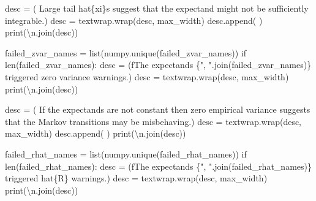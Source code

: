 \documentclass[
  letterpaper,
  DIV=11,
  numbers=noendperiod]{scrartcl}
\newenvironment{Shaded}{\begin{snugshade}}{\end{snugshade}}
\newcommand{\BuiltInTok}[1]{\textcolor[rgb]{0.00,0.23,0.31}{#1}}
\newcommand{\CharTok}[1]{\textcolor[rgb]{0.13,0.47,0.30}{#1}}
\newcommand{\ControlFlowTok}[1]{\textcolor[rgb]{0.00,0.23,0.31}{#1}}
\newcommand{\NormalTok}[1]{\textcolor[rgb]{0.00,0.23,0.31}{#1}}
\newcommand{\OperatorTok}[1]{\textcolor[rgb]{0.37,0.37,0.37}{#1}}
\newcommand{\SpecialCharTok}[1]{\textcolor[rgb]{0.37,0.37,0.37}{#1}}
\newcommand{\SpecialStringTok}[1]{\textcolor[rgb]{0.13,0.47,0.30}{#1}}
\newcommand{\StringTok}[1]{\textcolor[rgb]{0.13,0.47,0.30}{#1}}
\begin{document}
\begin{Shaded}
\begin{Highlighting}[]
\NormalTok{    desc }\OperatorTok{=}\NormalTok{ (}\StringTok{\textquotesingle{}  Large tail hat}\SpecialCharTok{\{xi\}}\StringTok{s suggest that the expectand \textquotesingle{}}
            \StringTok{\textquotesingle{}might not be sufficiently integrable.\textquotesingle{}}\NormalTok{)}
\NormalTok{    desc }\OperatorTok{=}\NormalTok{ textwrap.wrap(desc, max\_width)}
\NormalTok{    desc.append(}\StringTok{\textquotesingle{} \textquotesingle{}}\NormalTok{)}
    \BuiltInTok{print}\NormalTok{(}\StringTok{\textquotesingle{}}\CharTok{\textbackslash{}n}\StringTok{\textquotesingle{}}\NormalTok{.join(desc))}

\NormalTok{  failed\_zvar\_names }\OperatorTok{=} \BuiltInTok{list}\NormalTok{(numpy.unique(failed\_zvar\_names))}
  \ControlFlowTok{if} \BuiltInTok{len}\NormalTok{(failed\_zvar\_names):}
\NormalTok{    desc }\OperatorTok{=}\NormalTok{ (}\SpecialStringTok{f\textquotesingle{}The expectands }\SpecialCharTok{\{}\StringTok{", "}\SpecialCharTok{.}\NormalTok{join(failed\_zvar\_names)}\SpecialCharTok{\}}\SpecialStringTok{ \textquotesingle{}}
             \StringTok{\textquotesingle{}triggered zero variance warnings.\textquotesingle{}}\NormalTok{)}
\NormalTok{    desc }\OperatorTok{=}\NormalTok{ textwrap.wrap(desc, max\_width)}
    \BuiltInTok{print}\NormalTok{(}\StringTok{\textquotesingle{}}\CharTok{\textbackslash{}n}\StringTok{\textquotesingle{}}\NormalTok{.join(desc))}

\NormalTok{    desc }\OperatorTok{=}\NormalTok{ (}\StringTok{\textquotesingle{}  If the expectands are not constant then zero empirical\textquotesingle{}}
            \StringTok{\textquotesingle{} variance suggests that the Markov\textquotesingle{}}
            \StringTok{\textquotesingle{} transitions may be misbehaving.\textquotesingle{}}\NormalTok{)}
\NormalTok{    desc }\OperatorTok{=}\NormalTok{ textwrap.wrap(desc, max\_width)}
\NormalTok{    desc.append(}\StringTok{\textquotesingle{} \textquotesingle{}}\NormalTok{)}
    \BuiltInTok{print}\NormalTok{(}\StringTok{\textquotesingle{}}\CharTok{\textbackslash{}n}\StringTok{\textquotesingle{}}\NormalTok{.join(desc))}

\NormalTok{  failed\_rhat\_names }\OperatorTok{=} \BuiltInTok{list}\NormalTok{(numpy.unique(failed\_rhat\_names))}
  \ControlFlowTok{if} \BuiltInTok{len}\NormalTok{(failed\_rhat\_names):}
\NormalTok{    desc }\OperatorTok{=}\NormalTok{ (}\SpecialStringTok{f\textquotesingle{}The expectands }\SpecialCharTok{\{}\StringTok{", "}\SpecialCharTok{.}\NormalTok{join(failed\_rhat\_names)}\SpecialCharTok{\}}\SpecialStringTok{ \textquotesingle{}}
             \StringTok{\textquotesingle{}triggered hat}\SpecialCharTok{\{R\}}\StringTok{ warnings.\textquotesingle{}}\NormalTok{)}
\NormalTok{    desc }\OperatorTok{=}\NormalTok{ textwrap.wrap(desc, max\_width)}
    \BuiltInTok{print}\NormalTok{(}\StringTok{\textquotesingle{}}\CharTok{\textbackslash{}n}\StringTok{\textquotesingle{}}\NormalTok{.join(desc))}


\end{Highlighting}
\end{Shaded}
\end{document}
